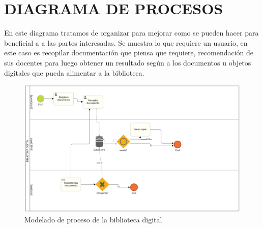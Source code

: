 \chapter*{DIAGRAMA DE PROCESOS}
En este diagrama tratamos de organizar para mejorar como se pueden hacer para beneficial a a las partes interesadas. Se muestra lo que requiere un usuario, en este caso es recopilar documentación que piensa que requiere, recomendación de sus docentes para luego obtener un resultado según a los documentos u objetos digitales que pueda alimentar a la biblioteca. 
\begin{figure}[ht]
	\centering
	\includegraphics[scale=0.5]{images/modeladoProceso1}
	\caption{Modelado de proceso de la biblioteca digital}
\end{figure}